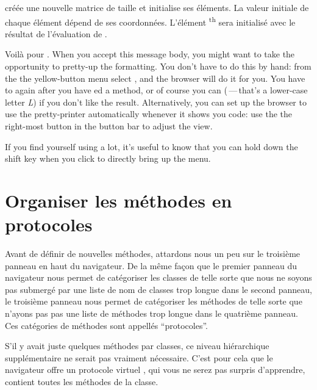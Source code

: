 \documentclass[a4paper,10pt,twoside]{book}
\begin{document}
 créée une nouvelle matrice de taille  et initialise ses éléments. La valeur initiale de chaque élément dépend de ses coordonnées. L'élément \textsuperscript{th} sera initialisé avec le résultat de l'évaluation de .  

Voilà pour .  When you accept this message body, you might want to take the opportunity to pretty-up the formatting.  You don't have to do this by hand: from the the yellow-button menu select , and the browser will do it for you.  You have to  again after you have ed a method, or of course you can  
(\,---\,that's a lower-case letter \emph{L}) if you don't like the result.
Alternatively, you can set up the browser to use the pretty-printer automatically whenever it shows you code: use the the right-most button in the button bar to adjust the view.

If you find yourself using  a lot, it's useful to know that you can hold down the {\sc shift} key when you click to directly bring up the  menu.

\section{Organiser les méthodes en protocoles}

Avant de définir de nouvelles méthodes, attardons nous un peu sur le troisième panneau en haut du navigateur.
De la même façon que le premier panneau du navigateur nous permet de catégoriser les classes de telle sorte que nous ne soyons pas submergé par une liste de nom de classes trop longue dans le second panneau, le troisième panneau nous permet de catégoriser les méthodes de telle sorte que n'ayons pas pas une liste de méthodes trop longue dans le quatrième panneau.
Ces catégories de méthodes sont appellés ``protocoles''.

S'il y avait juste quelques méthodes par classes, ce niveau hiérarchique supplémentaire ne serait pas vraiment nécessaire.
C'est pour cela que le navigateur offre un protocole virtuel , qui vous ne serez pas surpris d'apprendre, contient toutes les méthodes de la classe.
\end{document}
